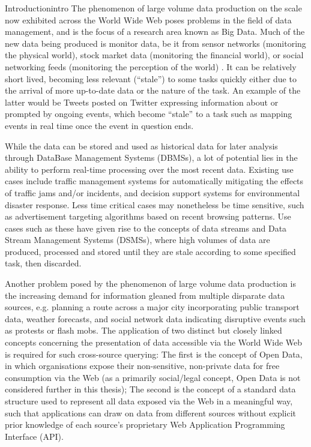 \begin{nestedsection}{Introduction}{intro}
	The phenomenon of large volume data production on the scale now exhibited across the World Wide Web poses problems in the field of data management, and is the focus of a research area known as Big Data.
	Much of the new data being produced is monitor data, be it from sensor networks (monitoring the physical world), stock market data (monitoring the financial world), or social networking feeds (monitoring the perception of the world) \citep{linkedstreamproc,massivelyConnectedWorld}.
	It can be relatively short lived, becoming less relevant (``stale'') to some tasks quickly either due to the arrival of more up-to-date data or the nature of the task.
	An example of the latter would be Tweets posted on Twitter expressing information about or prompted by ongoing events, which become ``stale'' to a task such as mapping events in real time once the event in question ends.

	While the data can be stored and used as historical data for later analysis through DataBase Management Systems (DBMSs), a lot of potential lies in the ability to perform real-time processing over the most recent data.
	Existing use cases include traffic management systems for automatically mitigating the effects of traffic jams and/or incidents, and decision support systems for environmental disaster response.
	Less time critical cases may nonetheless be time sensitive, such as advertisement targeting algorithms based on recent browsing patterns.
	Use cases such as these have given rise to the concepts of data streams and Data Stream Management Systems (DSMSs), where high volumes of data are produced, processed and stored until they are stale according to some specified task, then discarded.

	Another problem posed by the phenomenon of large volume data production is the increasing demand for information gleaned from multiple disparate data sources, e.g. planning a route across a major city incorporating public transport data, weather forecasts, and social network data indicating disruptive events such as protests or flash mobs.
	The application of two distinct but closely linked concepts concerning the presentation of data accessible via the World Wide Web is required for such cross-source querying:
	The first is the concept of Open Data, in which organisations expose their non-sensitive, non-private data for free consumption via the Web (as a primarily social/legal concept, Open Data is not considered further in this thesis);
	The second is the concept of a standard data structure used to represent all data exposed via the Web in a meaningful way, such that applications can draw on data from different sources without explicit prior knowledge of each source's proprietary Web Application Programming Interface (API).
	

\end{nestedsection}
